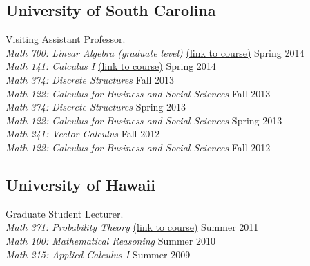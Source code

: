 \subsection*{University of South Carolina} Visiting Assistant Professor.\\[3pt]
\textsl{Math 700: Linear Algebra (graduate level)} \href{https://github.com/williamdemeo/Math700Spring2014}{{\small (link to course)}} \hfill  Spring 2014\\[\Xpt]
\textsl{Math 141: Calculus I} \href{https://github.com/williamdemeo/Math141Spring2014}{{\small (link to course)}} \hfill  Spring 2014\\[\Xpt]
\textsl{Math 374: Discrete Structures} \hfill  Fall 2013\\[\Xpt]
\textsl{Math 122: Calculus for Business and Social Sciences} \hfill  Fall 2013\\[\Xpt]
\textsl{Math 374: Discrete Structures} \hfill  Spring 2013\\[\Xpt]
\textsl{Math 122: Calculus for Business and Social Sciences} \hfill  Spring 2013\\[\Xpt]
\textsl{Math 241: Vector Calculus} \hfill  Fall 2012\\[\Xpt]
\textsl{Math 122: Calculus for Business and Social Sciences} \hfill  Fall 2012

\medskip

\subsection*{University of Hawaii} Graduate Student Lecturer.\\[3pt]
\textsl{Math 371: Probability Theory} \href{http://math.hawaii.edu/~williamdemeo/Math371-Summer2011/Math371.html}{{\small (link to course)}} \hfill   Summer 2011\\[\Xpt]
\textsl{Math 100: Mathematical Reasoning} \hfill   Summer 2010\\[\Xpt]
\textsl{Math 215: Applied Calculus I} \hfill   Summer 2009

\medskip

